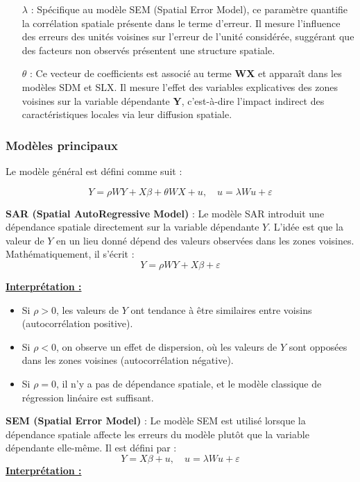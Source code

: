 \documentclass[
]{article}
\begin{document}
\begin{itemize}
\item[\(\lambda\)] : Spécifique au modèle SEM (Spatial Error Model), ce paramètre quantifie la corrélation spatiale présente dans le terme d'erreur. Il mesure l'influence des erreurs des unités voisines sur l'erreur de l'unité considérée, suggérant que des facteurs non observés présentent une structure spatiale.
\item[\(\theta\)] : Ce vecteur de coefficients est associé au terme \textbf{WX} et apparaît dans les modèles SDM et SLX. Il mesure l'effet des variables explicatives des zones voisines sur la variable dépendante \textbf{Y}, c'est-à-dire l'impact indirect des caractéristiques locales via leur diffusion spatiale.
\end{itemize}

\subsubsection{Modèles principaux}\label{moduxe8les-principaux}

Le modèle général est défini comme suit :

\[
Y = \rho W Y + X \beta + \theta W X + u, \quad u = \lambda W u + \varepsilon
\]

\textbf{SAR (Spatial AutoRegressive Model)} : Le modèle SAR introduit
une dépendance spatiale directement sur la variable dépendante \(Y\).
L'idée est que la valeur de \(Y\) en un lieu donné dépend des valeurs
observées dans les zones voisines. Mathématiquement, il s'écrit : \[
Y = \rho W Y + X \beta + \varepsilon
\]

\underline{\textbf{Interprétation :}}

\begin{itemize}
\item Si \( \rho > 0 \), les valeurs de \( Y \) ont tendance à être similaires entre voisins (autocorrélation positive).
\item Si \( \rho < 0 \), on observe un effet de dispersion, où les valeurs de \( Y \) sont opposées dans les zones voisines (autocorrélation négative).
\item Si \( \rho = 0 \), il n’y a pas de dépendance spatiale, et le modèle classique de régression linéaire est suffisant.
\end{itemize}

\textbf{SEM (Spatial Error Model)} : Le modèle SEM est utilisé lorsque
la dépendance spatiale affecte les erreurs du modèle plutôt que la
variable dépendante elle-même. Il est défini par : \[
Y = X \beta + u, \quad u = \lambda W u + \varepsilon
\] \underline{\textbf{Interprétation :}}
\end{document}
